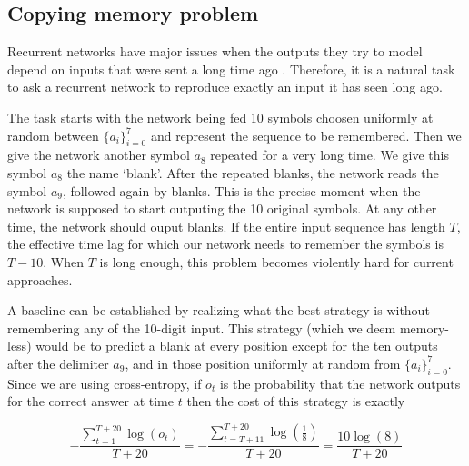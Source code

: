 \documentclass{article} %
\begin{document}
\subsection{Copying memory problem}
Recurrent networks have major issues when the outputs they try to model depend on inputs that were sent a long time ago \citep{Yoshua94} \citep{Pascanu2013}. Therefore, it is a natural task to ask a recurrent network to reproduce exactly an input it has seen long ago.

The task starts with the network being fed 10 symbols choosen uniformly at random between $\{a_i\}_{i=0}^7$ and represent the sequence to be remembered. Then we give the network another symbol $a_8$ repeated for a very long time. We give this symbol $a_8$ the name `blank'. After the repeated blanks, the network reads the symbol $a_9$, followed again by blanks. This is the precise moment when the network is supposed to start outputing the 10 original symbols. At any other time, the network should ouput blanks.
If the entire input sequence has length $T$, the effective time lag for which our network needs to remember the symbols is $T-10$. When $T$ is long enough, this problem becomes violently hard for current approaches.

A baseline can be established by realizing what the best strategy is without remembering any of the 10-digit input. This strategy (which we deem memory-less) would be to predict a blank at every position except for the ten outputs after the delimiter $a_9$, and in those position uniformly at random from $\{a_i\}_{i=0}^7$. Since we are using cross-entropy, if $o_t$ is the probability that the network outputs for the correct answer at time $t$ then the cost of this strategy is exactly

\begin{equation}
  -\frac{\sum_{t=1}^{T+20} \log (o_t)}{T+20} = - \frac{\sum_{t=T+11}^{T+20} \log \left( \frac{1}{8} \right)}{T+20} = \frac{10 \log(8)}{T+20} 
\end{equation}
\end{document}
